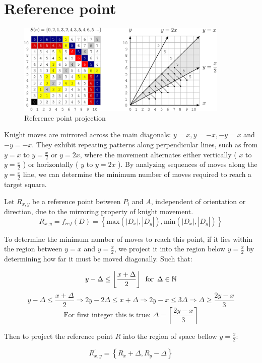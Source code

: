 \documentclass[a4paper, 12pt]{article}
\begin{document}
\section{Reference point}
\begin{figure}[H]
  \centering
  \includegraphics[width=0.9\textwidth]{figures/figure-2.png}
  \caption{Reference point projection}
\end{figure}
Knight moves are mirrored across the main diagonals: \( y = x, y = -x, -y = x \) and \( -y = -x \). They exhibit 
repeating patterns along perpendicular lines, such as from \( y = x \) to \( y = \frac{x}{2} \) or \( y = 2x \), 
where the movement alternates either vertically ( \( x \) to \( y = \frac{x}{2} \) ) or horizontally ( \( y  \) 
to \( y = 2x \) ). By analyzing sequences of moves along the \( y = \frac{x}{2} \) line,  we can determine the 
minimum number of moves required to reach a target square.

\vspace{1em}
\noindent Let \( R_{x,y} \) be a reference point between \( P_i \) and \( A \), independent of orientation or 
direction, due to the mirroring property of knight movement.
\[ 
R_{x,y} = f_{ref}(D) = \left\{ \text{max}(|D_x|,|D_y|), \text{min}(|D_x|,|D_y|) \right\} 
\]

\noindent To determine the minimum number of moves to reach this point, if it lies within the region between
\( y = x \) and \( y = \frac{x}{2} \), we project it into the region below \( y = \frac{x}{2} \) by determining how far 
it must be moved diagonally. Such that:

\vspace{0.5em}
\[
y - \Delta \le \left\lfloor \dfrac{x+\Delta}{2} \right\rfloor \hspace{0.5em} \text{for} \hspace{0.5em} \Delta \in \mathbb{N}
\]
\vspace{0.5em}
\[
y - \Delta \le \dfrac{x + \Delta}{2} \Rightarrow
2y - 2\Delta \le x + \Delta \Rightarrow
2y - x \le 3\Delta \Rightarrow
\Delta \ge \dfrac{2y - x}{3}
\]
\vspace{0.5em}
\[
\text{For first integer this is true: } \Delta = \left\lceil \dfrac{2y-x}{3}\right\rceil
\]
\begin{center}
Then to project the reference point \( R \) into the region of space bellow \( y=\frac{x}{2} \):
\end{center}
\[
R^{'}_{x,y} = \left\{ R_x + \Delta , R_y - \Delta \right\}
\]
\newpage
\end{document}
